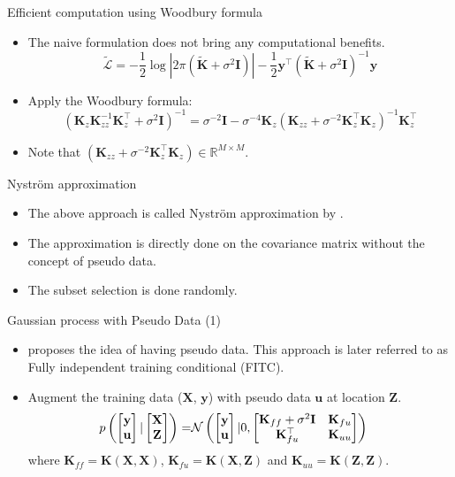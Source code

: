 \documentclass[14pt,aspectratio=1610]{beamer}
\newcommand{\yV}{\mathbf{y}}
\newcommand{\xM}{\mathbf{X}}
\newcommand{\K}{\mathbf{K}}
\newcommand{\R}{\mathbb{R}}
\newcommand{\uV}{\mathbf{u}}
\newcommand{\zM}{\mathbf{Z}}
\newcommand{\bound}{\mathcal{L}}
\newcommand{\I}{\mathbf{I}}
\begin{document}
\begin{frame}{Efficient computation using Woodbury formula}
\begin{itemize}
\item The naive formulation does not bring any computational benefits.
\[
\tilde{\bound} = -\frac{1}{2}\log |2\pi (\tilde{\K}+\sigma^2\I)| - \frac{1}{2} \yV^\top (\tilde{\K}+\sigma^2\I)^{-1} \yV
\]
\item Apply the Woodbury formula:
\[
(\K_z \K_{zz}^{-1} \K_z^\top+\sigma^2\I)^{-1} = \sigma^{-2}\I - \sigma^{-4} \K_z (\K_{zz} + \sigma^{-2}\K_z^\top\K_z)^{-1}\K_z^\top
\]
\item Note that $(\K_{zz} + \sigma^{-2}\K_z^\top\K_z) \in \R^{M \times M}$.
\end{itemize}
\end{frame}

\begin{frame}{Nystr\"{o}m approximation}
\begin{itemize}
\item The above approach is called Nystr\"{o}m approximation by \cite{WilliamsSeeger2001}.
\item The approximation is directly done on the covariance matrix without the concept of pseudo data.
\item The subset selection is done randomly.
\end{itemize}
\end{frame}

\begin{frame}{Gaussian process with Pseudo Data (1)}
\begin{itemize}
\item \cite{SnelsonZoubin2006} proposes the idea of having pseudo data. This approach is later referred to as  
Fully independent training conditional (FITC).
\item Augment the training data ($\xM$, $\yV$) with pseudo data $\uV$ at location $\zM$.
\begin{align*}
p\left(\begin{bmatrix}
\yV \\ \uV \end{bmatrix}|\begin{bmatrix}
\xM \\ \zM \end{bmatrix} \right) =&  \gaussianDist{\begin{bmatrix}
\yV \\ \uV \end{bmatrix}}{0}{\begin{bmatrix}
\K_{ff}+\sigma^2\I & \K_{fu}  \\ \K_{fu}^\top & \K_{uu} \end{bmatrix}}
\end{align*}
where $\K_{ff} = \K(\xM, \xM)$, $\K_{fu} = \K(\xM, \zM)$ and $\K_{uu} = \K(\zM, \zM)$.
\end{itemize}
\end{frame}
\end{document}
